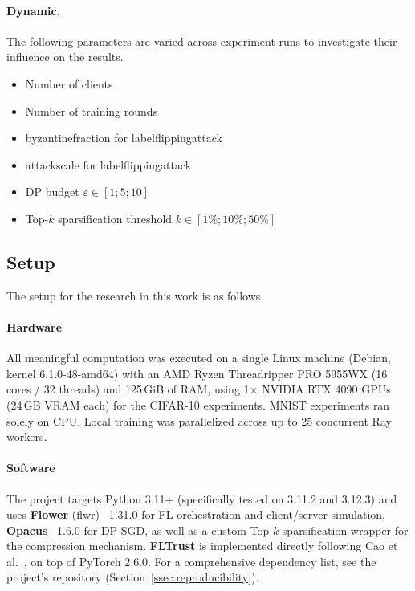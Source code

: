 \documentclass[11pt,twocolumn,a4paper,DIV=calc,parskip=half]{scrartcl}
\begin{document}
	\paragraph{Dynamic.} The following parameters are varied across experiment runs to investigate their influence on the results.

	\begin{itemize}
		\item Number of clients
		\item Number of training rounds
		\item \gls{byzantinefraction} for \gls{labelflippingattack}
		\item \Gls{attackscale} for \gls{labelflippingattack}
		\item \ac{DP} budget $\varepsilon \in [1;5;10]$
		\item Top-$k$ sparsification threshold $k \in [1\%;10\%;50\%]$
	\end{itemize}

	\subsection{Setup}
	The setup for the research in this work is as follows.

	\paragraph{Hardware} All meaningful computation was executed on a single Linux machine
	(Debian, kernel 6.1.0-48-amd64) with an AMD Ryzen Threadripper PRO 5955WX (16 cores / 32
	threads) and 125\,GiB of RAM, using 1$\times$ NVIDIA RTX 4090 GPUs (24\,GB VRAM each) for
	the CIFAR-10 experiments. MNIST experiments ran solely on CPU. Local training was parallelized across up to 25 concurrent Ray workers.

	\paragraph{Software} The project targets Python 3.11+ (specifically tested on 3.11.2 and 3.12.3) and uses \textbf{Flower} (flwr)~\cite{beutel2020flower} 1.31.0 for \ac{FL} orchestration and	client/server simulation, \textbf{Opacus}~\cite{yousefpour2021opacus} 1.6.0 for	\ac{DP-SGD}, as well as a custom Top-$k$ sparsification wrapper for the compression mechanism. \textbf{FLTrust} is implemented directly following Cao et al.~\cite{cao2021fltrust}, on top of PyTorch 2.6.0. For a comprehensive dependency list, see the project's repository (Section~\ref{ssec:reproducibility}).
\end{document}
